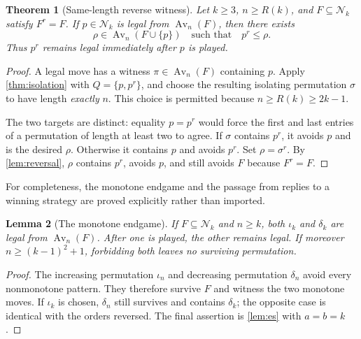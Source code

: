 \documentclass[11pt,a4paper]{article}
\newtheorem{theorem}{Theorem}[section]
\newtheorem{lemma}[theorem]{Lemma}
\theoremstyle{definition}
\theoremstyle{remark}
\DeclareMathOperator{\Av}{Av}
\newcommand{\Nk}{\mathcal N_k}
\newcommand{\id}{\iota}
\newcommand{\decr}{\delta}
\newcommand{\replybound}{R(k)}
\begin{document}
\begin{theorem}[Same-length reverse witness]\label{thm:reply}
Let $k\ge3$, $n\ge\replybound$, and $F\subseteq\Nk$ satisfy $F^r=F$.
If $p\in\Nk$ is legal from $\Av_n(F)$, then there exists
\[
 \rho\in\Av_n(F\cup\{p\})\quad\text{such that}\quad p^r\le\rho.
\]
Thus $p^r$ remains legal immediately after $p$ is played.
\end{theorem}
\begin{proof}
A legal move has a witness $\pi\in\Av_n(F)$ containing $p$.
Apply \cref{thm:isolation} with $Q=\{p,p^r\}$, and choose the resulting
isolating permutation $\sigma$ to have length \emph{exactly} $n$.
This choice is permitted because $n\ge\replybound\ge2k-1$.

The two targets are distinct: equality $p=p^r$ would force the first and
last entries of a permutation of length at least two to agree. If $\sigma$
contains $p^r$, it avoids $p$ and is the desired $\rho$. Otherwise it contains
$p$ and avoids $p^r$. Set $\rho=\sigma^r$. By \cref{lem:reversal}, $\rho$
contains $p^r$, avoids $p$, and still avoids $F$ because $F^r=F$.
\end{proof}

For completeness, the monotone endgame and the passage from replies to a
winning strategy are proved explicitly rather than imported.

\begin{lemma}[The monotone endgame]\label{lem:endgame}
If $F\subseteq\Nk$ and $n\ge k$, both $\id_k$ and $\decr_k$ are legal from
$\Av_n(F)$. After one is played, the other remains legal. If moreover
$n\ge(k-1)^2+1$, forbidding both leaves no surviving permutation.
\end{lemma}
\begin{proof}
The increasing permutation $\id_n$ and decreasing permutation $\decr_n$
avoid every nonmonotone pattern. They therefore survive $F$ and witness the
two monotone moves. If $\id_k$ is chosen, $\decr_n$ still survives and
contains $\decr_k$; the opposite case is identical with the orders reversed.
The final assertion is \cref{lem:es} with $a=b=k$.
\end{proof}
\end{document}
